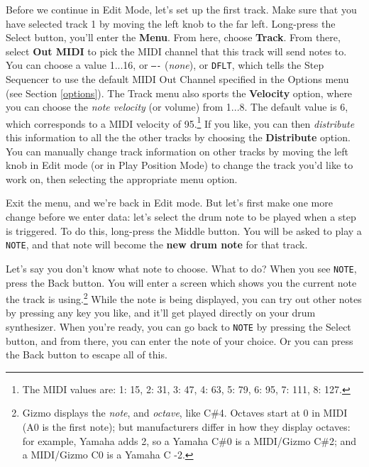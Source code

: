 \documentclass{article}
\begin{document}
Before we continue in Edit Mode, let's set up the first track.  Make sure that you have selected track 1 by moving the left knob to the far left.  Long-press the Select button, you'll enter the {\bf Menu}.  From here, choose {\bf Track}.  From there, select {\bf Out MIDI} to pick the MIDI channel that this track will send notes to.  You can choose a value 1...16, or \texttt{----} ({\it none}), or \texttt{DFLT}, which tells the Step Sequencer to use the default MIDI Out Channel specified in the Options menu (see Section \ref{options}).  The Track menu also sports the {\bf Velocity} option, where you can choose the {\it note velocity} (or volume) from 1...8.  The default value is 6, which corresponds to a MIDI velocity of 95.\footnote{The MIDI values are:  1: 15, 2: 31, 3: 47, 4: 63, 5: 79, 6: 95, 7: 111, 8: 127.}  If you like, you can then {\it distribute} this information to all the the other tracks by choosing the {\bf Distribute} option.  You can manually change track information on other tracks by moving the left knob in Edit mode (or in Play Position Mode) to change the track you'd like to work on, then selecting the appropriate menu option.

Exit the menu, and we're back in Edit mode.  But let's first make one more change before we enter data: let's select the drum note to be played when a step is triggered.  To do this, long-press the Middle button.  You will be asked to play a {\tt NOTE}, and that note will become the {\bf new drum note} for that track.  

Let's say you don't know what note to choose.  What to do?  When you see {\tt NOTE}, press the Back button.   You will enter a screen which shows you the current note the track is using.\footnote{Gizmo displays the {\it note}, and {\it octave}, like C\#4.  Octaves start at 0 in MIDI (A0 is the first note); but manufacturers differ in how they display octaves: for example, Yamaha adds 2, so a Yamaha C\#0 is a MIDI/Gizmo C\#2; and a MIDI/Gizmo C0 is a Yamaha C -2.}   While the note is being displayed, you can try out other notes by pressing any key you like, and it'll get played directly on your drum synthesizer.  When you're ready, you can go back to {\tt NOTE} by pressing the Select button, and from there, you can enter the note of your choice.  Or you can press the Back button to escape all of this.
\end{document}
